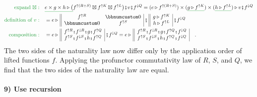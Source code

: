 \begin{align*}
{\color{greenunder}\text{expand }\boxtimes:}\quad & \gunderline{e\times g\times h\triangleright\big(}f^{\uparrow(R+S)}\boxtimes f^{\uparrow K}\boxtimes f^{\uparrow L}\big)\bef v\bef f^{\downarrow Q}=(e\triangleright f^{\uparrow(R+S)})\times(\gunderline{g\triangleright f^{\uparrow K}})\times(\gunderline{h\triangleright f^{\uparrow L}})\triangleright v\bef f^{\downarrow Q}\\
{\color{greenunder}\text{definition of }v:}\quad & =e\triangleright\,\begin{array}{||cc|}
f^{\uparrow R} & \bbnum 0\\
\bbnum 0 & f^{\uparrow S}
\end{array}\,\bef\,\begin{array}{||c|}
g\triangleright f^{\uparrow K}\\
h\triangleright f^{\uparrow L}
\end{array}\,\bef f^{\downarrow Q}\\
{\color{greenunder}\text{composition}:}\quad & =e\triangleright\,\begin{array}{||c|}
f^{\uparrow R}\bef f^{\downarrow R}\bef g\bef f^{\uparrow Q}\\
f^{\uparrow S}\bef f^{\downarrow S}\bef h\bef f^{\uparrow Q}
\end{array}\,\bef f^{\downarrow Q}=e\triangleright\,\begin{array}{||c|}
f^{\uparrow R}\bef f^{\downarrow R}\bef g\bef f^{\uparrow Q}\bef f^{\downarrow Q}\\
f^{\uparrow S}\bef f^{\downarrow S}\bef h\bef f^{\uparrow Q}\bef f^{\downarrow Q}
\end{array}\quad.
\end{align*}
The two sides of the naturality law now differ only by the application
order of lifted functions $f$. Applying the profunctor commutativity
law of $R$, $S$, and $Q$, we find that the two sides of the naturality
law are equal.

\paragraph{9) Use recursion}


